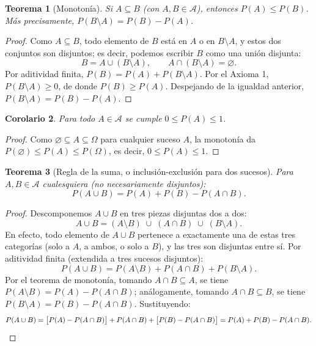 \documentclass[11pt,a4paper]{article}
\theoremstyle{plain}
\newtheorem{teorema}{Teorema}[section]
\newtheorem{corolario}[teorema]{Corolario}
\theoremstyle{definition}
\theoremstyle{remark}
\begin{document}
\begin{teorema}[Monotonía]
Si $A \subseteq B$ (con $A,B\in\mathcal{A}$), entonces $P(A) \leq P(B)$. Más precisamente, $P(B\setminus A) = P(B)-P(A)$.
\end{teorema}

\begin{proof}
Como $A \subseteq B$, todo elemento de $B$ está en $A$ o en $B\setminus A$, y estos dos conjuntos son disjuntos; es decir, podemos escribir $B$ como una unión disjunta:
\[
B = A \cup (B\setminus A), \qquad A \cap (B\setminus A) = \varnothing.
\]
Por aditividad finita, $P(B) = P(A) + P(B\setminus A)$. Por el Axioma 1, $P(B\setminus A)\geq 0$, de donde $P(B) \geq P(A)$. Despejando de la igualdad anterior, $P(B\setminus A)=P(B)-P(A)$.
\end{proof}

\begin{corolario}
Para todo $A \in \mathcal{A}$ se cumple $0 \leq P(A) \leq 1$.
\end{corolario}

\begin{proof}
Como $\varnothing \subseteq A \subseteq \Omega$ para cualquier suceso $A$, la monotonía da $P(\varnothing) \leq P(A) \leq P(\Omega)$, es decir, $0 \leq P(A) \leq 1$.
\end{proof}

\begin{teorema}[Regla de la suma, o inclusión-exclusión para dos sucesos]
Para $A, B \in \mathcal{A}$ cualesquiera (no necesariamente disjuntos):
\[
P(A \cup B) = P(A) + P(B) - P(A \cap B).
\]
\end{teorema}

\begin{proof}
Descomponemos $A\cup B$ en tres piezas disjuntas dos a dos:
\[
A\cup B = (A\setminus B) \;\cup\; (A\cap B) \;\cup\; (B\setminus A).
\]
En efecto, todo elemento de $A\cup B$ pertenece a exactamente una de estas tres categorías (solo a $A$, a ambos, o solo a $B$), y las tres son disjuntas entre sí. Por aditividad finita (extendida a tres sucesos disjuntos):
\[
P(A\cup B) = P(A\setminus B) + P(A\cap B) + P(B\setminus A).
\]
Por el teorema de monotonía, tomando $A\cap B \subseteq A$, se tiene $P(A\setminus B) = P(A) - P(A\cap B)$; análogamente, tomando $A\cap B \subseteq B$, se tiene $P(B\setminus A)=P(B)-P(A\cap B)$. Sustituyendo:
\[
P(A\cup B) = \big[P(A)-P(A\cap B)\big] + P(A\cap B) + \big[P(B)-P(A\cap B)\big] = P(A)+P(B)-P(A\cap B). \qedhere
\]
\end{proof}
\end{document}
